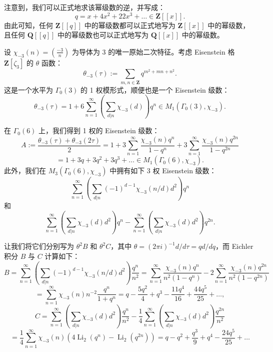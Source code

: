 注意到，我们可以正式地求该幂级数的逆，并写成：
\begin{equation}\label{eq:11.1.3}
q = x + 4x^2 + 22x^3 + \dots \in \mathbf{Z}[\![x]\!].
\end{equation}
由此可知，任何 $\mathbf{Z}[\![q]\!]$ 中的幂级数都可以正式地写为 $\mathbf{Z}[\![x]\!]$ 中的幂级数，且任何 $\mathbf{Q}[\![q]\!]$ 中的幂级数也可以正式地写为 $\mathbf{Q}[\![x]\!]$ 中的幂级数。

设 $\chi_{-3}(n) = \left(\frac{-3}{n}\right)$ 为导体为 3 的唯一原始二次特征。考虑 Eisenstein 格 $\mathbf{Z}[\zeta_3]$ 的 $\theta$ 函数：
\[ \theta_{-3}(\tau) := \sum_{m,n \in \mathbf{Z}} q^{m^2 + mn + n^2}. \]
这是一个水平为 $\Gamma_0(3)$ 的 1 权模形式，顺便也是一个 Eisenstein 级数：
\[ \theta_{-3}(\tau) = 1 + 6 \sum_{n=1}^{\infty} \left( \sum_{d|n} \chi_{-3}(d) \right) q^n \in M_1(\Gamma_0(3), \chi_{-3}). \]

在 $\Gamma_0(6)$ 上，我们得到 1 权的 Eisenstein 级数：
\[ A := \frac{\theta_{-3}(\tau) + \theta_{-3}(2\tau)}{2} = 1 + 3\sum_{n=1}^{\infty} \frac{\chi_{-3}(n)q^n}{1 - q^n} + 3\sum_{n=1}^{\infty} \frac{\chi_{-3}(n)q^{2n}}{1 - q^{2n}} \]
\[ = 1 + 3q + 3q^2 + 3q^3 + \dots \in M_1(\Gamma_0(6), \chi_{-3}). \]
此外，我们在 $M_3(\Gamma_0(6), \chi_{-3})$ 中拥有如下 3 权 Eisenstein 级数：
\[ \sum_{n=1}^{\infty} \left( \sum_{d|n} (-1)^{d-1} \chi_{-3}(n/d) d^2 \right) q^n \]
和
\[ \sum_{n=1}^{\infty} \left( \sum_{d|n} \chi_{-3}(d) d^2 \right) q^n - \sum_{n=1}^{\infty} \left( \sum_{d|n} \chi_{-3}(d) d^2 \right) q^{2n}. \]

让我们将它们分别写为 $\theta^2 B$ 和 $\theta^2 C$，其中 $\theta = (2\pi i)^{-1} d/d\tau = qd/dq$，而 Eichler 积分 $B$ 与 $C$ 计算如下：
\[ B = \sum_{n=1}^{\infty} \left( \sum_{d|n} (-1)^{d-1} \chi_{-3}(n/d) d^2 \right) \frac{q^n}{n^2} = \sum_{n=1}^{\infty} \frac{\chi_{-3}(n) q^n}{n^2 (1 - q^n)} - 2 \sum_{n=1}^{\infty} \frac{\chi_{-3}(n) q^{2n}}{n^2 (1 - q^{2n})} \]
\[ = \sum_{n=1}^{\infty} \chi_{-3}(n) n^{-2} \frac{q^n}{1 + q^n} = q - \frac{5q^2}{4} + q^3 - \frac{11q^4}{16} + \frac{44q^5}{25} + \dots, \]
\[ C = \sum_{n=1}^{\infty} \left( \sum_{d|n} \chi_{-3}(d) d^2 \right) \frac{q^n}{n^2} - \frac{1}{4} \sum_{n=1}^{\infty} \left( \sum_{d|n} \chi_{-3}(d) d^2 \right) \frac{q^{2n}}{n^2} \]
\[ = \frac{1}{4} \sum_{n=1}^{\infty} \chi_{-3}(n) \left( 4 \operatorname{Li}_2(q^n) - \operatorname{Li}_2(q^{2n}) \right) = q - q^2 + \frac{q^3}{9} + q^4 - \frac{24q^5}{25} + \dots \]

